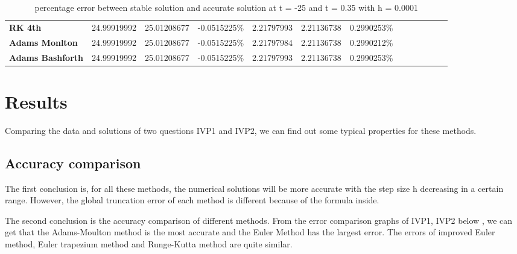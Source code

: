 \documentclass[a4paper]{article}
\begin{document}
\begin{table}[H]
{\begin{tabular}{@{}lllllllcccccc@{}}
				\textbf{RK 4th}                & 24.99919992                                        & 25.01208677                                          & -0.0515225\%                                   & 2.21797993                                         & 2.21136738                                           & 0.2990253\%                         \\
				\textbf{Adams Monlton}         & 24.99919992                                        & 25.01208677                                          & -0.0515225\%                                   & 2.21797984                                         & 2.21136738                                           & 0.2990212\%                               \\
				\textbf{Adams Bashforth}       & 24.99919992                                        & 25.01208677                                          & -0.0515225\%                                   & 2.21797993                                         & 2.21136738                                           & 0.2990253\%                               \\
				\bottomrule
			\end{tabular}%
		}
		\caption{percentage error between stable solution and accurate solution at t = -25 and t = 0.35 with h = 0.0001}
		\label{tab:IVP2_error}
	\end{table}
	
	\section{Results}
	Comparing the data and solutions of two questions IVP1 and IVP2, we can find out some typical properties for these methods.
	
	
	\subsection{Accuracy comparison}
	
	The first conclusion is, for all these methods, the numerical solutions will be more accurate with the step size h decreasing in a certain range. 
	However, the global truncation error of each method is different because of the formula inside. 
	
	
	The second conclusion is the accuracy comparison of different methods. From the error comparison graphs of IVP1, IVP2 below , we can get that the Adams-Moulton method is the most accurate and the Euler Method has the largest error. The errors of improved Euler method, Euler trapezium method and Runge-Kutta method are quite similar. 
	
\end{document}
